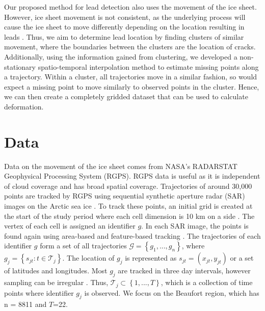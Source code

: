 \documentclass[12pt]{article}
\begin{document}
Our proposed method for lead detection also uses the movement of the ice
sheet. However, ice sheet movement is not consistent, as the underlying
process will cause the ice sheet to move differently depending on the
location resulting in leads \citep{peterson_evaluating_2011}. Thus, we
aim to determine lead location by finding clusters of similar movement,
where the boundaries between the clusters are the location of cracks.
Additionally, using the information gained from clustering, we developed
a non-stationary spatio-temporal interpolation method to estimate
missing points along a trajectory. Within a cluster, all trajectories
move in a similar fashion, so would expect a missing point to move
similarly to observed points in the cluster. Hence, we can then create a
completely gridded dataset that can be used to calculate deformation.

\hypertarget{data}{%
\section{Data}\label{data}}

Data on the movement of the ice sheet comes from NASA's RADARSTAT
Geophysical Processing System (RGPS). RGPS data is useful as it is
independent of cloud coverage and has broad spatial coverage.
Trajectories of around 30,000 points are tracked by RGPS using
sequential synthetic aperture radar (SAR) images on the Arctic sea ice
\citep{lindsay_radarsat_2003}. To track these points, an initial grid is
created at the start of the study period where each cell dimension is 10
km on a side \citep{kwok_seasonal_2002}. The vertex of each cell is
assigned an identifier \(g\). In each SAR image, the points is found
again using area-based and feature-based tracking
\citep{peterson_evaluating_2011}. The trajectories of each identifier
\(g\) form a set of all trajectories
\(\mathcal{G} =\left\{g_1,...,g_n\right\}\), where
\(g_j = \left\{s_{jt}: t \in \mathcal{T}_j\right\}\). The location of
\(g_j\) is represented as \(s_{jt} = (x_{jt}, y_{jt})\) or a set of
latitudes and longitudes. Most \(g_j\) are tracked in three day
intervals, however sampling can be irregular
\citep{peterson_evaluating_2011}. Thus,
\(\mathcal{T}_j \subset \left\{1,...,T\right\}\), which is a collection
of time points where identifier \(g_j\) is observed. We focus on the
Beaufort region, which has n = 8811 and \(T\)=22.
\end{document}
